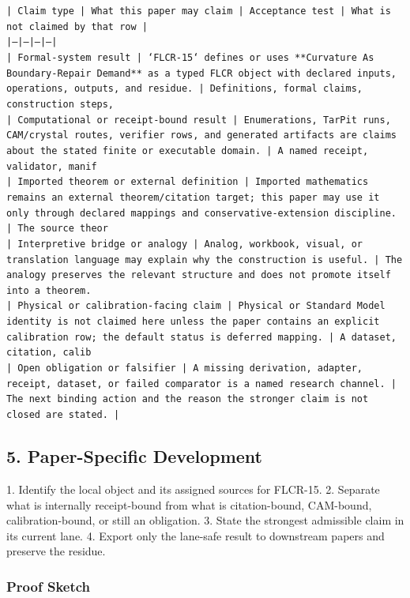 \documentclass[11pt]{article}
\begin{document}
\noindent\texttt{| Claim type | What this paper may claim | Acceptance test | What is not claimed by that row |}\\
\noindent\texttt{|---|---|---|---|}\\
\noindent\texttt{| Formal-system result | `FLCR-15` defines or uses **Curvature As Boundary-Repair Demand** as a typed FLCR object with declared inputs, operations, outputs, and residue. | Definitions, formal claims, construction steps, }\\
\noindent\texttt{| Computational or receipt-bound result | Enumerations, TarPit runs, CAM/crystal routes, verifier rows, and generated artifacts are claims about the stated finite or executable domain. | A named receipt, validator, manif}\\
\noindent\texttt{| Imported theorem or external definition | Imported mathematics remains an external theorem/citation target; this paper may use it only through declared mappings and conservative-extension discipline. | The source theor}\\
\noindent\texttt{| Interpretive bridge or analogy | Analog, workbook, visual, or translation language may explain why the construction is useful. | The analogy preserves the relevant structure and does not promote itself into a theorem. }\\
\noindent\texttt{| Physical or calibration-facing claim | Physical or Standard Model identity is not claimed here unless the paper contains an explicit calibration row; the default status is deferred mapping. | A dataset, citation, calib}\\
\noindent\texttt{| Open obligation or falsifier | A missing derivation, adapter, receipt, dataset, or failed comparator is a named research channel. | The next binding action and the reason the stronger claim is not closed are stated. | }\\

\subsection*{5. Paper-Specific Development}

1. Identify the local object and its assigned sources for FLCR-15.
2. Separate what is internally receipt-bound from what is citation-bound, CAM-bound, calibration-bound, or still an obligation.
3. State the strongest admissible claim in its current lane.
4. Export only the lane-safe result to downstream papers and preserve the residue.

\subsubsection*{Proof Sketch}
\end{document}
